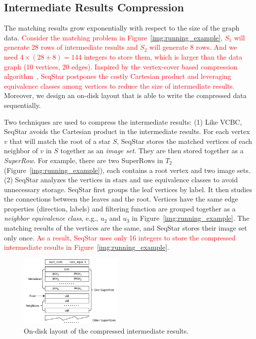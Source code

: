 \subsection{Intermediate Results Compression}\label{sec:match_compress}
The matching results grow exponentially with respect to the size of the graph data.
\textcolor{red}{Consider the matching problem in Figure~\ref{img:running_example},
$S_1$ will generate 28 rows of intermediate results and $S_2$ will generate 8 rows.
And we need $4 \times (28 + 8) = 144$ integers to store them, which is larger than the data graph (10 vertices, 20 edges).
Inspired by the vertex-cover based compression algorithm~\cite{DBLP:journals/pvldb/QiaoZC17},
SeqStar postpones the costly Cartesian product and leveraging equivalence classes among vertices to reduce the size of intermediate results.}
Moreover, we design an on-disk layout that is able to write the compressed data sequentially.

Two techniques are used to compress the intermediate results:
(1) Like VCBC, SeqStar avoids the Cartesian product in the intermediate results.
For each vertex $v$ that will match the root of a star $S$,
SeqStar stores the matched vertices of each neighbor of $v$ in $S$ together as an \emph{image set}.
They are then stored together as a \emph{SuperRow}.
For example, there are two SuperRows in $T_2$ (Figure~\ref{img:running_example}),
each contains a root vertex and two image sets.
(2) SeqStar analyzes the vertices in stars and use equivalence classes to avoid unnecessary storage.
SeqStar first groups the leaf vertices by label.
It then studies the connections between the leaves and the root.
Vertices have the same edge properties (direction, labels) and filtering function are grouped together as a \emph{neighbor equivalence class},
e.g., $u_2$ and $u_3$ in Figure~\ref{img:running_example}.
The matching results of the vertices are the same, and SeqStar stores their image set only once.
\textcolor{red}{As a result, SeqStar uses only 16 integers to store the compressed intermediate results in Figure~\ref{img:running_example}.}
\begin{figure}[ht]
  \centering
  \includegraphics[width=0.45\textwidth]{img/compress.pdf}
  \caption{On-disk layout of the compressed intermediate results.}\label{img:compress}
\end{figure}

